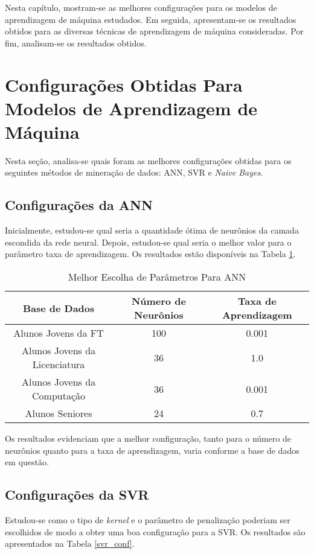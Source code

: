 Nesta capítulo, mostram-se as melhores configurações para os modelos de aprendizagem
de máquina estudados. Em seguida, apresentam-se os resultados obtidos para as
diversas técnicas de aprendizagem de máquina consideradas. Por fim, analisam-se os
resultados obtidos. 

\section{Configurações Obtidas Para Modelos de Aprendizagem de Máquina}
\label{conf_ml_models}
Nesta seção, analisa-se quais foram as melhores configurações obtidas para os
seguintes métodos de mineração de dados: ANN, SVR e \textit{Naive Bayes}. 

\subsection{Configurações da ANN} \label{ann_best_conf}
Inicialmente, estudou-se qual seria a quantidade ótima de neurônios da camada
escondida da rede neural.
Depois, estudou-se qual seria o melhor valor para o parâmetro taxa de aprendizagem. 
Os resultados estão disponíveis na Tabela \ref{conf_ann}. 

\begin{table}
\caption{Melhor Escolha de Parâmetros Para ANN}
\begin{center}
\begin{tabular}[c]{| c | c | c |}
    \hline
    \textbf{Base de Dados} & \textbf{Número de Neurônios} & \textbf{Taxa de
    Aprendizagem} \\
    \hline
    Alunos Jovens da FT & 100 & 0.001 \\
    \hline
    Alunos Jovens da Licenciatura & 36 & 1.0 \\
    \hline
    Alunos Jovens da Computação & 36 & 0.001 \\
    \hline
    Alunos Seniores & 24  & 0.7 \\
    \hline
\end{tabular}
\end{center}
\label{conf_ann}
\end{table}

Os resultados evidenciam que a melhor configuração, tanto para o número de neurônios
quanto para a taxa de aprendizagem, varia conforme a base de dados em questão. 

\subsection{Configurações da SVR} \label{svr_best_conf}
Estudou-se como o tipo de \textit{kernel} e o parâmetro de penalização
poderiam ser escolhidos de modo a obter uma boa configuração para a SVR. Os
resultados são apresentados na Tabela \ref{svr_conf}. 

